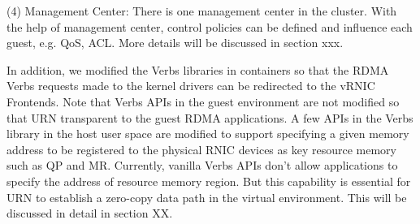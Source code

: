 (4) Management Center: There is one management center in the cluster. With the help of management center, control policies can be defined and influence each guest, e.g. QoS, ACL. More details will be discussed in section xxx.

In addition,  we modified the Verbs libraries in containers so that the RDMA Verbs requests made to the kernel drivers can be redirected to the vRNIC Frontends. Note that Verbs APIs in the guest environment are not modified so that URN transparent to the guest RDMA applications. A few APIs in the Verbs library in the host user space are modified to support specifying a given memory address to be registered to the physical RNIC devices as key resource memory such as QP and MR. Currently, vanilla Verbs APIs don't allow applications to specify the address of resource memory region. But this capability is essential for URN to establish a zero-copy data path in the virtual environment. This will be discussed in detail in section XX.
